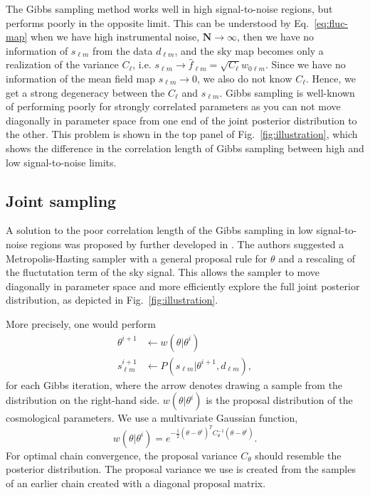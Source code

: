 \documentclass[twocolumn]{../common/aa}
\begin{document}
The Gibbs sampling method works well in high signal-to-noise regions, but performs poorly in the opposite limit. This can be understood by Eq.~\eqref{eq:fluc-map} when we have high instrumental noise, $\mathbf{N} \rightarrow \infty$, then we have no information of $s_{\ell m}$ from the data $d_{\ell m}$, and the sky map becomes only a realization of the variance $C_{\ell}$, i.e. $s_{\ell m} \rightarrow \hat{f}_{\ell m} = \sqrt{C_{\ell}} w_{0\ell m}$. Since we have no information of the mean field map $\hat{s}_{\ell m} \rightarrow 0$, we also do not know $C_\ell$. Hence, we get a strong degeneracy between the $C_\ell$ and $s_{\ell m}$. Gibbs sampling is well-known of performing poorly for strongly correlated parameters as you can not move diagonally in parameter space from one end of the joint posterior distribution to the other. This problem is shown in the top panel of Fig.~\ref{fig:illustration}, which shows the difference in the correlation length of Gibbs sampling between high and low signal-to-noise limits.

\subsection{Joint sampling}
\label{sec:joint-sampling}
A solution to the poor correlation length of the Gibbs sampling in low signal-to-noise regions was proposed by \cite{jewell:2009} further developed in \cite{racine:2016}. The authors suggested a Metropolis-Hasting sampler with a general proposal rule for $\theta$ and a rescaling of the fluctutation term of the sky signal. This allows the sampler to move diagonally in parameter space and more efficiently explore the full joint posterior distribution, as depicted in Fig.~\ref{fig:illustration}.

More precisely, one would perform
\begin{align}
    \theta^{i+1} 
 &\leftarrow w(\theta |\theta^i)\\
    s_{\ell m}^{i+1} &\leftarrow P(s_{\ell m} | \theta^{i+1}, d_{\ell m}),
\end{align}
for each Gibbs iteration, where the arrow denotes drawing a sample from the distribution on the right-hand side. $w(\theta |\theta^i)$ is the proposal distribution of the cosmological parameters. We use a multivariate Gaussian function,
\begin{equation}
w(\theta |\theta^i) = e^{-\frac12 \left(\theta - \theta^i \right)^T C_{\theta}^{-1}\left(\theta - \theta^i \right)}.
\end{equation}
For optimal chain convergence, the proposal variance $C_{\theta}$ should resemble the posterior distribution. The proposal variance we use is created from the samples of an earlier chain created with a diagonal proposal matrix.
\end{document}

